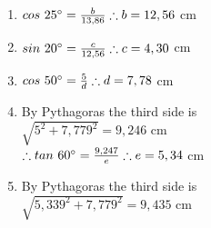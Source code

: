 \begin{eocsolutions}{}
{\begin{enumerate}[itemsep=6pt, label=\textbf{\arabic*}. ]
\begin{multicols}{2}
\begin{enumerate}[itemsep=3pt, label=\textbf{(\alph*)} ]
\item$cos~25^{\circ} =\frac{b}{13,86}\\\therefore b=12,56$ cm
\item$sin~20^{\circ} =\frac{c}{12,56}\\ \therefore c=4,30$ cm
\item$cos~50^{\circ} =\frac{5}{d} \\ \therefore d=7,78$ cm
\item By Pythagoras the third side is \\$\sqrt{5^2 + 7,779^2} = 9,246$ cm\\

$\therefore tan~60^{\circ} = \frac{9,247}{e}\\ \therefore e=5,34$ cm
\item By Pythagoras the third side is \\$\sqrt{5,339^2 + 7,779^2} = 9,435$ cm\\


\end{enumerate}
\end{multicols}
\end{enumerate}}
\end{eocsolutions}
